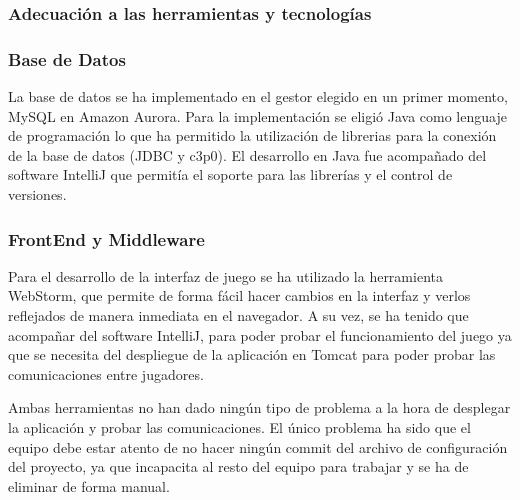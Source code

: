 \subsubsection{Adecuación a las herramientas y tecnologías}
\subsubsection*{Base de Datos}
La base de datos se ha implementado en el gestor elegido en un primer momento, MySQL en Amazon Aurora. Para la implementación se eligió Java como lenguaje de programación lo que ha permitido la utilización de librerias para la conexión de la base de datos (JDBC y c3p0). El desarrollo en Java fue acompañado del software IntelliJ que permitía el soporte para las librerías y el control de versiones. 
\subsubsection*{FrontEnd y Middleware}
Para el desarrollo de la interfaz de juego se ha utilizado la herramienta WebStorm, que permite de forma fácil hacer cambios en la interfaz y verlos reflejados de manera inmediata en el navegador. A su vez, se ha tenido que acompañar del software IntelliJ, para poder probar el funcionamiento del juego ya que se necesita del despliegue de la aplicación en Tomcat para poder probar las comunicaciones entre jugadores.

Ambas herramientas no han dado ningún tipo de problema a la hora de desplegar la aplicación y probar las comunicaciones. El único problema ha sido que el equipo debe estar atento de no hacer ningún commit del archivo de configuración del proyecto, ya que incapacita al resto del equipo para trabajar y se ha de eliminar de forma manual.


